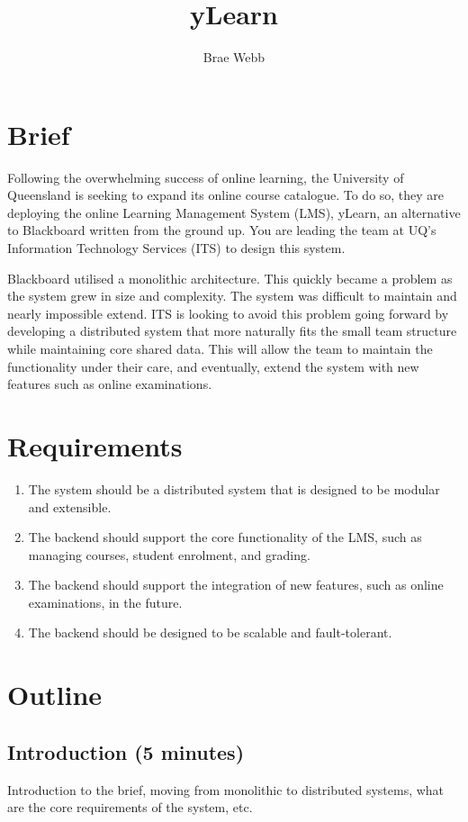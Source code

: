 \documentclass{csse4400}
\title{yLearn}
\author{Brae Webb}
\date{\week[tutorial]{4}}
\begin{document}
\maketitle

\section{Brief}

Following the overwhelming success of online learning,
the University of Queensland is seeking to expand its online course catalogue.
To do so, they are deploying the online Learning Management System (LMS),
yLearn, an alternative to Blackboard written from the ground up.
You are leading the team at UQ's Information Technology Services (ITS) to design this system.

Blackboard utilised a monolithic architecture.
This quickly became a problem as the system grew in size and complexity.
The system was difficult to maintain and nearly impossible extend.
ITS is looking to avoid this problem going forward
by developing a distributed system that more naturally fits the small team structure while maintaining core shared data.
This will allow the team to maintain the functionality under their care, and eventually,
extend the system with new features such as online examinations.

\section{Requirements}

\begin{enumerate}
\item The system should be a distributed system that is designed to be modular and extensible.
\item The backend should support the core functionality of the LMS, such as managing courses, student enrolment, and grading.
\item The backend should support the integration of new features, such as online examinations, in the future.
\item The backend should be designed to be scalable and fault-tolerant.
\end{enumerate}

\section{Outline}

\subsection*{Introduction (5 minutes)}
Introduction to the brief,
moving from monolithic to distributed systems,
what are the core requirements of the system,
etc.
\end{document}
